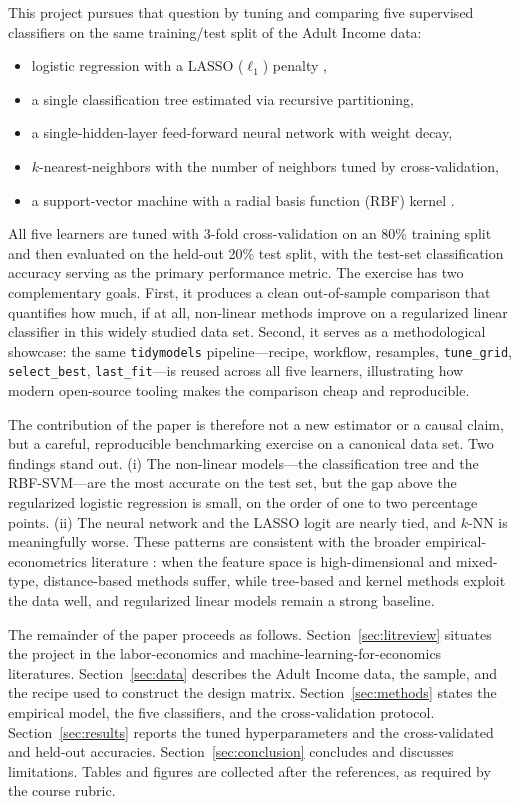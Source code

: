 \documentclass[12pt,english]{article}
\begin{document}
This project pursues that question by tuning and comparing five supervised
classifiers on the same training/test split of the Adult Income data:
\begin{itemize}
\item logistic regression with a LASSO ($\ell_1$) penalty \citep{tibshirani1996},
\item a single classification tree estimated via recursive partitioning,
\item a single-hidden-layer feed-forward neural network with weight decay,
\item $k$-nearest-neighbors with the number of neighbors tuned by cross-validation,
\item a support-vector machine with a radial basis function (RBF) kernel \citep{cortes1995}.
\end{itemize}
All five learners are tuned with 3-fold cross-validation on an 80\% training
split and then evaluated on the held-out 20\% test split, with the test-set
classification accuracy serving as the primary performance metric. The
exercise has two complementary goals. First, it produces a clean
out-of-sample comparison that quantifies how much, if at all, non-linear
methods improve on a regularized linear classifier in this widely studied
data set. Second, it serves as a methodological showcase: the same
\texttt{tidymodels} pipeline---recipe, workflow, resamples,
\texttt{tune\_grid}, \texttt{select\_best}, \texttt{last\_fit}---is reused
across all five learners, illustrating how modern open-source tooling
makes the comparison cheap and reproducible.

The contribution of the paper is therefore not a new estimator or a
causal claim, but a careful, reproducible benchmarking exercise on a
canonical data set. Two findings stand out. (i) The non-linear models---the
classification tree and the RBF-SVM---are the most accurate on the test
set, but the gap above the regularized logistic regression is small,
on the order of one to two percentage points. (ii) The neural network
and the LASSO logit are nearly tied, and $k$-NN is meaningfully worse.
These patterns are consistent with the broader empirical-econometrics
literature \citep{varian2014,mullainathanSpiess2017,athey2019}: when the
feature space is high-dimensional and mixed-type, distance-based methods
suffer, while tree-based and kernel methods exploit the data well, and
regularized linear models remain a strong baseline.

The remainder of the paper proceeds as follows.
Section~\ref{sec:litreview} situates the project in the labor-economics
and machine-learning-for-economics literatures.
Section~\ref{sec:data} describes the Adult Income data, the sample,
and the recipe used to construct the design matrix.
Section~\ref{sec:methods} states the empirical model, the five
classifiers, and the cross-validation protocol.
Section~\ref{sec:results} reports the tuned hyperparameters and the
cross-validated and held-out accuracies.
Section~\ref{sec:conclusion} concludes and discusses limitations.
Tables and figures are collected after the references, as required by
the course rubric.
\end{document}

